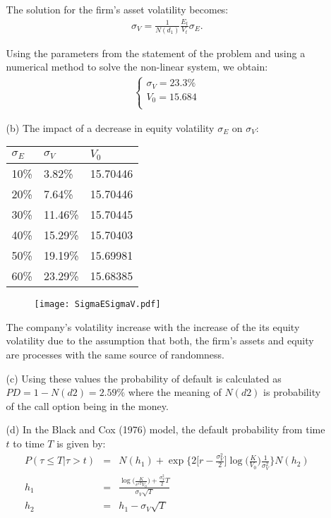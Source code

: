 \documentclass[11pt,oneside,a4paper, titlepage]{article}
\begin{document}
\begin{enumerate}
\begin{enumerate}
The solution for the firm's asset volatility becomes: 
\begin{eqnarray*}
\sigma_V=\frac{1}{N(d_1)}\frac{E_t}{V_t}\sigma_E.
\end{eqnarray*}

Using the parameters from the statement of the problem and using a numerical method to solve the non-linear system, we obtain:
\begin{eqnarray*}
	\left\{ \begin{array}{ll}	
	\sigma_V = 23.3\% \\
	V_0 = 15.684\\	
	\end{array} \right.	
\end{eqnarray*}

		\item[(b)] The impact of a decrease in equity volatility \(\sigma_E\) on \(\sigma_V\):
\vskip 0.2cm 		
{
	\centering
	\begin{tabular}{|l|l|l|}
		\hline
		\(\sigma_E\) & \(\sigma_V\) & \(V_0\) \\
		\hline		
		 10\% &  3.82\%  &  15.70446 \\
		\hline				 
		 20\% &  7.64\%  & 15.70446 \\
		\hline				 
		 30\% &  11.46\%  & 15.70445 \\
		\hline				 
		 40\% &  15.29\% &  15.70403 \\
		\hline				 
		 50\% &  19.19\%   & 15.69981 \\
		\hline				 
		 60\% &  23.29\%  & 15.68385 \\	
		\hline		
	\end{tabular}
}

\begin{figure}[h!]
	\texttt{[image: SigmaESigmaV.pdf]}
\end{figure}
 
The company's volatility increase with the increase of the its equity volatility due to the assumption that both, the firm's assets and equity are processes with the same source of randomness.
		\item[(c)]
Using these values the probability of default is calculated as \(PD = 1- N(d2) = 2.59\%\) where the meaning of \(N(d2)\) is
probability of the call option being in the money.

\newpage
		\item[(d)]	
		In the Black and Cox (1976) model, the default probability from time \(t\) to time \(T\) is given by:
\begin{eqnarray*}
	P(\tau \le T | \tau>t) &=& N(h_1) + \exp\bigg\{ 2\bigg[r-\frac{\sigma_V^2}{2}\bigg] \log\bigg(\frac{K}{V_0}\bigg) \frac{1}{\sigma_V^2} \bigg\} N(h_2) \\
	h_1 &=& \frac{\log\big(\frac{K}{e^{rT}V_0}\big)+\frac{\sigma_V^2}{2}T}{\sigma_V \sqrt{T}} \\ 
	h_2 &=& h_1-\sigma_V \sqrt{T}
\end{eqnarray*}
					

\end{enumerate}
\end{enumerate}
\end{document}
